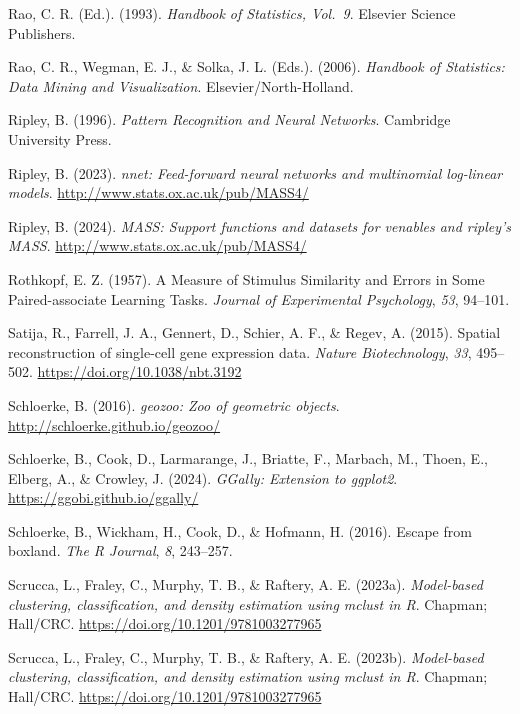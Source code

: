 \documentclass[
  letterpaper,
]{krantz}
\newlength{\cslhangindent}
\newenvironment{CSLReferences}[2] %
 {\begin{list}{}{%
  \setlength{\itemindent}{0pt}
  \setlength{\leftmargin}{0pt}
  \setlength{\parsep}{0pt}
  \ifodd #1
   \setlength{\leftmargin}{\cslhangindent}
   \setlength{\itemindent}{-1\cslhangindent}
  \fi
  \setlength{\itemsep}{#2\baselineskip}}}
 {\end{list}}
\begin{document}
\begin{CSLReferences}{1}{0}
Rao, C. R. (Ed.). (1993). \emph{{H}andbook of {S}tatistics, {V}ol.~9}.
Elsevier Science Publishers.

Rao, C. R., Wegman, E. J., \& Solka, J. L. (Eds.). (2006).
\emph{Handbook of {S}tatistics: {D}ata {M}ining and {V}isualization}.
Elsevier/North-Holland.

Ripley, B. (1996). \emph{Pattern {R}ecognition and {N}eural {N}etworks}.
Cambridge University Press.

Ripley, B. (2023). \emph{{nnet}: Feed-forward neural networks and
multinomial log-linear models}.
\url{http://www.stats.ox.ac.uk/pub/MASS4/}

Ripley, B. (2024). \emph{{MASS}: Support functions and datasets for
venables and ripley's MASS}. \url{http://www.stats.ox.ac.uk/pub/MASS4/}

Rothkopf, E. Z. (1957). A {M}easure of {S}timulus {S}imilarity and
{E}rrors in {S}ome {P}aired-associate {L}earning {T}asks. \emph{Journal
of Experimental Psychology}, \emph{53}, 94--101.

Satija, R., Farrell, J. A., Gennert, D., Schier, A. F., \& Regev, A.
(2015). Spatial reconstruction of single-cell gene expression data.
\emph{Nature Biotechnology}, \emph{33}, 495--502.
\url{https://doi.org/10.1038/nbt.3192}

Schloerke, B. (2016). \emph{{geozoo}: Zoo of geometric objects}.
\url{http://schloerke.github.io/geozoo/}

Schloerke, B., Cook, D., Larmarange, J., Briatte, F., Marbach, M.,
Thoen, E., Elberg, A., \& Crowley, J. (2024). \emph{{GGally}: Extension
to ggplot2}. \url{https://ggobi.github.io/ggally/}

Schloerke, B., Wickham, H., Cook, D., \& Hofmann, H. (2016). Escape from
boxland. \emph{The R Journal}, \emph{8}, 243--257.

Scrucca, L., Fraley, C., Murphy, T. B., \& Raftery, A. E. (2023a).
\emph{Model-based clustering, classification, and density estimation
using {mclust} in {R}}. Chapman; Hall/CRC.
\url{https://doi.org/10.1201/9781003277965}

Scrucca, L., Fraley, C., Murphy, T. B., \& Raftery, A. E. (2023b).
\emph{Model-based clustering, classification, and density estimation
using {mclust} in {R}}. Chapman; Hall/CRC.
\url{https://doi.org/10.1201/9781003277965}


\end{CSLReferences}
\end{document}
